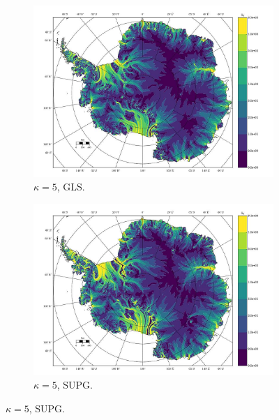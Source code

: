\begin{figure}
  \begin{subfigure}[b]{0.45\linewidth}
    \includegraphics[width=\linewidth]{images/balance_velocity/antarctica/d_U_ob/Ubar_10H_kappa_5_GLS.jpg}
  \caption{$\kappa = 5$, GLS.}
  \label{antarctica_bv_image_d_U_ob_kappa_5_GLS}
  \end{subfigure}
  \begin{subfigure}[b]{0.45\linewidth}
    \includegraphics[width=\linewidth]{images/balance_velocity/antarctica/d_U_ob/Ubar_10H_kappa_5_SUPG.jpg}
  \caption{$\kappa = 5$, SUPG.}
  \label{antarctica_bv_image_d_U_ob_kappa_5_SUPG}
  \end{subfigure}


\end{figure}
